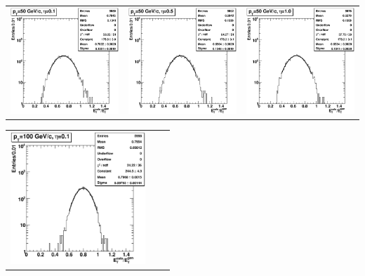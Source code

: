 \documentclass{cmspaper}
\begin{document}
\begin{appendices}
\begin{center}
\begin{tabular}{lll}
 \includegraphics[width=2in]{figs/h_ETRatio_ET_py_fit_corr_eta0.1_pT50.eps} &
 \includegraphics[width=2in]{figs/h_ETRatio_ET_py_fit_corr_eta0.5_pT50.eps} &
 \includegraphics[width=2in]{figs/h_ETRatio_ET_py_fit_corr_eta1.0_pT50.eps} \\
\end{tabular}
\end{center}
\begin{center}
\begin{tabular}{lll}
 \includegraphics[width=2in]{figs/h_ETRatio_ET_py_fit_corr_eta0.1_pT100.eps} &

\end{tabular}
\end{center}
\end{appendices}
\end{document}
